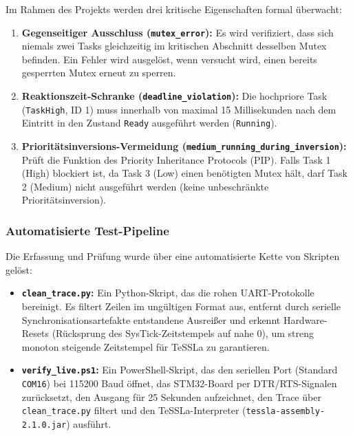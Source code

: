 \documentclass[11pt,a4paper]{article}
\begin{document}
Im Rahmen des Projekts werden drei kritische Eigenschaften formal überwacht:
\begin{enumerate}
    \item \textbf{Gegenseitiger Ausschluss (\texttt{mutex\_error}):} Es wird verifiziert, dass sich niemals zwei Tasks gleichzeitig im kritischen Abschnitt desselben Mutex befinden. Ein Fehler wird ausgelöst, wenn versucht wird, einen bereits gesperrten Mutex erneut zu sperren.
    \item \textbf{Reaktionszeit-Schranke (\texttt{deadline\_violation}):} Die hochpriore Task (\texttt{TaskHigh}, ID 1) muss innerhalb von maximal 15 Millisekunden nach dem Eintritt in den Zustand \texttt{Ready} ausgeführt werden (\texttt{Running}).
    \item \textbf{Prioritätsinversions-Vermeidung (\texttt{medium\_running\_during\_inversion}):} Prüft die Funktion des Priority Inheritance Protocols (PIP). Falls Task 1 (High) blockiert ist, da Task 3 (Low) einen benötigten Mutex hält, darf Task 2 (Medium) nicht ausgeführt werden (keine unbeschränkte Prioritätsinversion).
\end{enumerate}

\subsubsection{Automatisierte Test-Pipeline}
Die Erfassung und Prüfung wurde über eine automatisierte Kette von Skripten gelöst:
\begin{itemize}
    \item \textbf{\texttt{clean\_trace.py}:} Ein Python-Skript, das die rohen UART-Protokolle bereinigt. Es filtert Zeilen im ungültigen Format aus, entfernt durch serielle Synchronisationsartefakte entstandene Ausreißer und erkennt Hardware-Resets (Rücksprung des SysTick-Zeitstempels auf nahe 0), um streng monoton steigende Zeitstempel für TeSSLa zu garantieren.
    \item \textbf{\texttt{verify\_live.ps1}:} Ein PowerShell-Skript, das den seriellen Port (Standard \texttt{COM16}) bei 115200 Baud öffnet, das STM32-Board per DTR/RTS-Signalen zurücksetzt, den Ausgang für 25 Sekunden aufzeichnet, den Trace über \texttt{clean\_trace.py} filtert und den TeSSLa-Interpreter (\texttt{tessla-assembly-2.1.0.jar}) ausführt.
\end{itemize}
\end{document}
